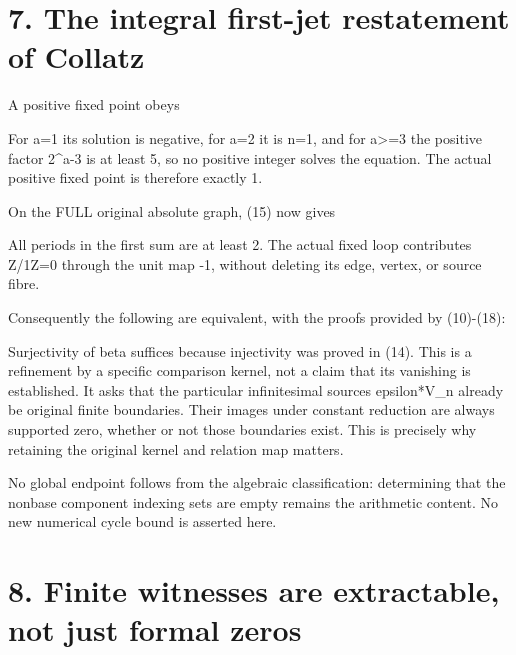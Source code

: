 \section{7. The integral first-jet restatement of Collatz}

A positive fixed point obeys


For a=1 its solution is negative, for a=2 it is n=1, and for
a\textgreater=3 the positive factor 2\^{}a-3 is at least 5, so no
positive integer solves the equation. The actual positive fixed point is
therefore exactly 1.

On the FULL original absolute graph, (15) now gives


All periods in the first sum are at least 2. The actual fixed loop
contributes Z/1Z=0 through the unit map -1, without deleting its edge,
vertex, or source fibre.

Consequently the following are equivalent, with the proofs provided by
(10)-(18):


Surjectivity of beta suffices because injectivity was proved in (14).
This is a refinement by a specific comparison kernel, not a claim that
its vanishing is established. It asks that the particular infinitesimal
sources epsilon*V\_n already be original finite boundaries. Their images
under constant reduction are always supported zero, whether or not those
boundaries exist. This is precisely why retaining the original kernel
and relation map matters.

No global endpoint follows from the algebraic classification:
determining that the nonbase component indexing sets are empty remains
the arithmetic content. No new numerical cycle bound is asserted here.

\section{8. Finite witnesses are extractable, not just formal zeros}


